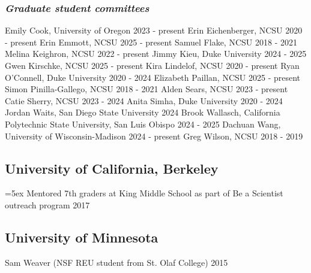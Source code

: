 \documentclass[11pt,english]{article}
\begin{document}
\subsubsection*{\emph{Graduate student committees}}
Emily Cook, University of Oregon \hfill {2023 - present} \newline
Erin Eichenberger, NCSU \hfill {2020 - present} \newline 
Erin Emmott, NCSU \hfill {2025 - present} \newline 
Samuel Flake, NCSU \hfill {2018 - 2021} \newline
Melina Keighron, NCSU \hfill {2022 - present} \newline
Jimmy Kieu, Duke University \hfill {2024 - 2025} \newline
Gwen Kirschke, NCSU \hfill {2025 - present} \newline
Kira Lindelof, NCSU \hfill {2020 - present} \newline
Ryan O'Connell, Duke University \hfill {2020 - 2024} \newline
Elizabeth Paillan, NCSU \hfill {2025 - present} \newline 
Simon Pinilla-Gallego, NCSU \hfill {2018 - 2021} \newline
Alden Sears, NCSU \hfill {2023 - present} \newline
Catie Sherry, NCSU \hfill {2023 - 2024} \newline
Anita Simha, Duke University \hfill {2020 - 2024} \newline
Jordan Waits, San Diego State University \hfill {2024} \newline
Brook Wallasch, California Polytechnic State University, San Luis Obispo \hfill {2024 - 2025} \newline
Dachuan Wang, University of Wisconsin-Madison \hfill {2024 - present} \newline
Greg Wilson, NCSU \hfill {2018 - 2019} 

\subsection*{University of California, Berkeley}
\hangindent=5ex Mentored 7th graders at King Middle School as part of Be a Scientist outreach program \hfill {2017} 

\subsection*{University of Minnesota}
Sam Weaver (NSF REU student from St. Olaf College)		 \hfill {2015} 
\end{document}
